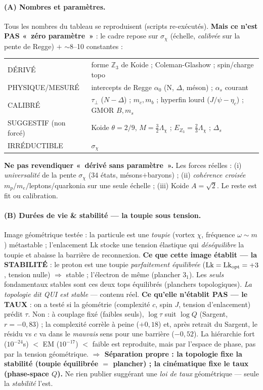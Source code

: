 \documentclass[11pt]{article}
\begin{document}
\paragraph{(A) Nombres et paramètres.} Tous les nombres du tableau se reproduisent (scripts re-exécutés). \textbf{Mais ce n'est PAS «~zéro paramètre~»} : le cadre repose sur $\sigma_\chi$ (échelle, \emph{calibrée} sur la pente de Regge) $+$ $\sim$8--10 constantes :
\begin{center}\footnotesize
\begin{tabular}{@{}ll@{}}
\toprule
DÉRIVÉ & forme $\mathbb{Z}_3$ de Koide ; Coleman-Glashow ; spin/charge topo \\
PHYSIQUE/MESURÉ & intercepts de Regge $\alpha_0$ (N, $\Delta$, méson) ; $\alpha_s$ courant \\
CALIBRÉ & $\tau_\perp$ ($N{-}\Delta$) ; $m_c,m_b$ ; hyperfin lourd ($J/\psi{-}\eta_c$) ; GMOR $B,m_s$ \\
SUGGESTIF (non forcé) & Koide $\theta{=}2/9$, $M{=}\tfrac32\Lambda_\chi$ ; $E_{Z_3}{=}\tfrac23\Lambda_\chi$ ; $\Delta_s$ \\
IRRÉDUCTIBLE & $\sigma_\chi$ \\
\bottomrule
\end{tabular}
\end{center}
\textbf{Ne pas revendiquer «~dérivé sans paramètre~».} Les forces réelles : (i) \emph{universalité} de la pente $\sigma_\chi$ (34 états, mésons$+$baryons) ; (ii) \emph{cohérence croisée} $m_p/m_e/$leptons/quarkonia sur une seule échelle ; (iii) Koide $A=\sqrt2$. Le reste est fit ou calibration.

\paragraph{(B) Durées de vie \& stabilité --- la toupie sous tension.} Image géométrique testée : la particule est une \emph{toupie} (vortex $\chi$, fréquence $\omega\sim m$) métastable ; l'enlacement $\mathrm{Lk}$ stocke une tension élastique qui \emph{déséquilibre} la toupie et abaisse la barrière de reconnexion. \textbf{Ce que cette image établit --- la STABILITÉ} : le proton est une toupie \emph{parfaitement équilibrée} ($\mathrm{Lk}=\mathrm{Lk}_{\rm opt}={+}3$, tension nulle) $\Rightarrow$ stable ; l'électron de même (plancher $3_1$). Les \emph{seuls} fondamentaux stables sont ces deux tops équilibrés (planchers topologiques). \emph{La topologie dit QUI est stable} --- contenu réel. \textbf{Ce qu'elle n'établit PAS --- le TAUX} : on a testé si la géométrie (complexité $c$, spin $J$, tension d'enlacement) prédit $\tau$. Non : à couplage fixé (faibles seuls), $\log\tau$ suit $\log Q$ (Sargent, $r={-}0{,}83$) ; la complexité corrèle à peine ($+0{,}18$) et, après retrait du Sargent, le résidu vs $c$ va dans le \emph{mauvais} sens pour une barrière ($-0{,}52$). La hiérarchie fort ($10^{-24}$s) $<$ EM ($10^{-17}$) $<$ faible est reproduite, mais par l'espace de phase, pas par la tension géométrique. \textbf{$\Rightarrow$ Séparation propre : la topologie fixe la stabilité (toupie équilibrée $=$ plancher) ; la cinématique fixe le taux (phase-space $Q$).} Ne rien publier suggérant une \emph{loi de taux} géométrique --- seule la \emph{stabilité} l'est.
\end{document}
